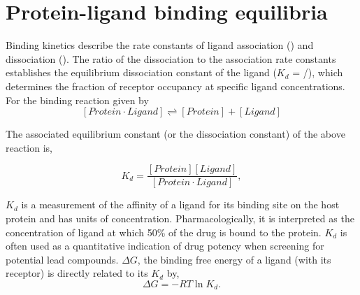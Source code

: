 \section{Protein-ligand binding equilibria}

Binding kinetics describe the rate constants of ligand association (\kon) and dissociation (\koff). The ratio of the dissociation to the association rate constants establishes the equilibrium dissociation constant of the ligand ($K_{d}$ = \koff/\kon), which determines the fraction of receptor occupancy at specific ligand concentrations. For the binding reaction given by
\begin{equation}
\left[ Protein\cdot Ligand \right] \rightleftharpoons \left[ Protein \right]+\left[ Ligand \right]
\end{equation}
 
The associated equilibrium constant (or the dissociation constant) of the above reaction is,

 \begin{equation}
  K_{d} = \frac{\left[ Protein \right]\left[ Ligand \right]}{\left[Protein \cdot Ligand\right]},
 \end{equation}

$K_d$ is a measurement of the affinity of a ligand for its binding site on the host protein and has units of concentration. Pharmacologically, it is interpreted as the concentration of ligand at which 50\% of the drug is bound to the protein. $K_d$ is often used as a quantitative indication of drug potency when screening for potential lead compounds. $\Delta G$, the binding free energy of a ligand (with its receptor) is directly related to its $K_{d}$ by,
\begin{equation}
	\Delta G = -RT\ln K_{d}.
\end{equation}



